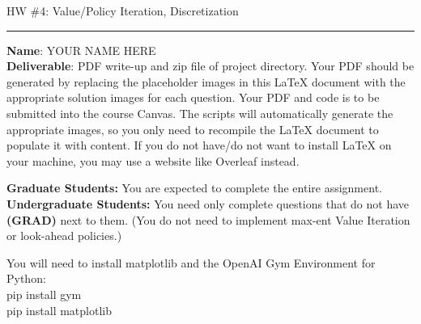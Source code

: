 \documentclass{article}
\newcommand{\ruleskip}{\bigskip\hrule\bigskip}
\begin{document}
\pagestyle{myheadings} 

{\huge
\noindent HW \#4: Value/Policy Iteration, Discretization}\\
\ruleskip
{\bf Name}: YOUR NAME HERE\\

{\bf Deliverable}:  PDF write-up and zip file of project directory.  Your PDF should be generated by replacing the placeholder images in this LaTeX document with the appropriate solution images for each question.  Your PDF and code is to be submitted into the course Canvas. The scripts will automatically generate the appropriate images, so you only need to recompile the LaTeX document to populate it with content. If you do not have/do not want to install LaTeX on your machine, you may use a website like Overleaf instead.

\textbf{Graduate Students:} You are expected to complete the entire assignment.\\
\textbf{Undergraduate Students:} You need only complete questions that do not have \textbf{(GRAD)} next to them. (You do not need to implement max-ent Value Iteration or look-ahead policies.)\\

\vspace{.1in}

You will need to install matplotlib and the OpenAI Gym Environment for Python:\\
pip install gym\\
pip install matplotlib

\vspace{.2in}

\end{document}
